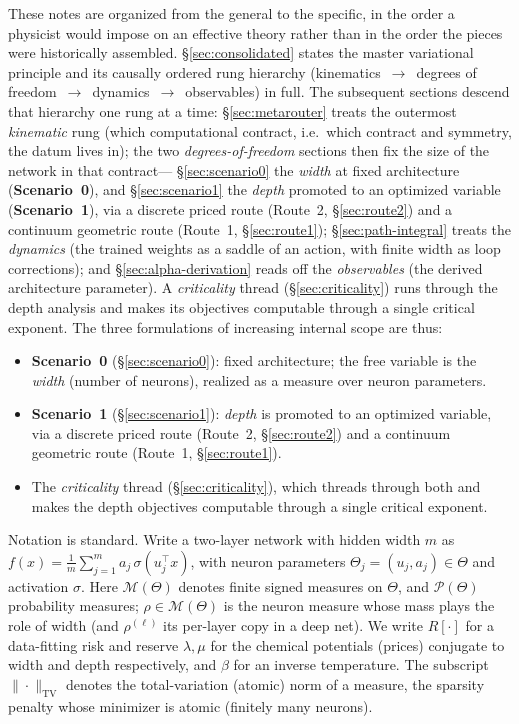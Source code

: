 \documentclass[11pt]{article}
\theoremstyle{definition}
\newcommand{\M}{\mathcal{M}}
\newcommand{\Pcal}{\mathcal{P}}
\newcommand{\TV}{\mathrm{TV}}
\begin{document}
These notes are organized from the general to the specific, in the order a physicist would impose on
an effective theory rather than in the order the pieces were historically assembled. \S\ref{sec:consolidated}
states the master variational principle and its causally ordered rung hierarchy
(kinematics~$\to$~degrees of freedom~$\to$~dynamics~$\to$~observables) in full. The subsequent sections
descend that hierarchy one rung at a time: \S\ref{sec:metarouter} treats the outermost \emph{kinematic}
rung (which computational contract, i.e.\ which contract and symmetry, the datum lives in); the two
\emph{degrees-of-freedom} sections then fix the size of the network in that contract---%
\S\ref{sec:scenario0} the \emph{width} at fixed architecture (\textbf{Scenario~0}), and
\S\ref{sec:scenario1} the \emph{depth} promoted to an optimized variable (\textbf{Scenario~1}), via a
discrete priced route (Route~2, \S\ref{sec:route2}) and a continuum geometric route
(Route~1, \S\ref{sec:route1}); \S\ref{sec:path-integral} treats the \emph{dynamics} (the trained weights
as a saddle of an action, with finite width as loop corrections); and \S\ref{sec:alpha-derivation} reads
off the \emph{observables} (the derived architecture parameter). A \emph{criticality} thread
(\S\ref{sec:criticality}) runs through the depth analysis and makes its objectives computable through a
single critical exponent. The three formulations of increasing internal scope are thus:
\begin{itemize}[leftmargin=1.4em]
\item \textbf{Scenario~0} (\S\ref{sec:scenario0}): fixed architecture; the free variable
is the \emph{width} (number of neurons), realized as a measure over neuron parameters.
\item \textbf{Scenario~1} (\S\ref{sec:scenario1}): \emph{depth} is promoted to an
optimized variable, via a discrete priced route (Route~2, \S\ref{sec:route2}) and a
continuum geometric route (Route~1, \S\ref{sec:route1}).
\item The \emph{criticality} thread (\S\ref{sec:criticality}), which threads through both
and makes the depth objectives computable through a single critical exponent.
\end{itemize}

Notation is standard. Write a two-layer network with hidden width $m$ as
$f(x)=\frac1m\sum_{j=1}^m a_j\,\sigma(u_j^\top x)$, with neuron parameters
$\Theta_j=(u_j,a_j)\in\Theta$ and activation $\sigma$. Here $\M(\Theta)$ denotes finite signed
measures on $\Theta$, and $\Pcal(\Theta)$ probability measures; $\rho\in\M(\Theta)$ is the neuron
measure whose mass plays the role of width (and $\rho^{(\ell)}$ its per-layer copy in a deep net). We
write $R[\cdot]$ for a
data-fitting risk and reserve $\lambda,\mu$ for the chemical potentials (prices) conjugate
to width and depth respectively, and $\beta$ for an inverse temperature. The subscript
$\|\cdot\|_{\TV}$ denotes the total-variation (atomic) norm of a measure, the sparsity penalty whose
minimizer is atomic (finitely many neurons).
\end{document}
